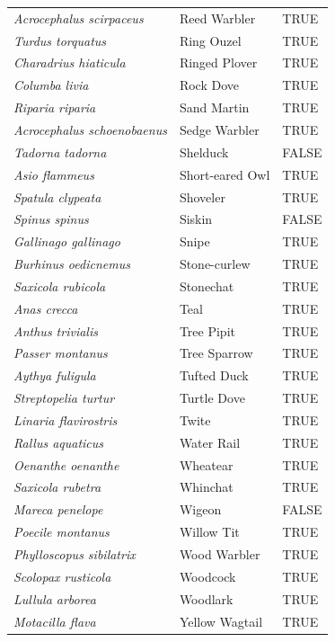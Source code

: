 \documentclass[
]{article}
\begin{document}
\begin{longtable}[]{@{}lll@{}}
\textit{Acrocephalus scirpaceus} & Reed Warbler & TRUE \\
\textit{Turdus torquatus} & Ring Ouzel & TRUE \\
\textit{Charadrius hiaticula} & Ringed Plover & TRUE \\
\textit{Columba livia} & Rock Dove & TRUE \\
\textit{Riparia riparia} & Sand Martin & TRUE \\
\textit{Acrocephalus schoenobaenus} & Sedge Warbler & TRUE \\
\textit{Tadorna tadorna} & Shelduck & FALSE \\
\textit{Asio flammeus} & Short-eared Owl & TRUE \\
\textit{Spatula clypeata} & Shoveler & TRUE \\
\textit{Spinus spinus} & Siskin & FALSE \\
\textit{Gallinago gallinago} & Snipe & TRUE \\
\textit{Burhinus oedicnemus} & Stone-curlew & TRUE \\
\textit{Saxicola rubicola} & Stonechat & TRUE \\
\textit{Anas crecca} & Teal & TRUE \\
\textit{Anthus trivialis} & Tree Pipit & TRUE \\
\textit{Passer montanus} & Tree Sparrow & TRUE \\
\textit{Aythya fuligula} & Tufted Duck & TRUE \\
\textit{Streptopelia turtur} & Turtle Dove & TRUE \\
\textit{Linaria flavirostris} & Twite & TRUE \\
\textit{Rallus aquaticus} & Water Rail & TRUE \\
\textit{Oenanthe oenanthe} & Wheatear & TRUE \\
\textit{Saxicola rubetra} & Whinchat & TRUE \\
\textit{Mareca penelope} & Wigeon & FALSE \\
\textit{Poecile montanus} & Willow Tit & TRUE \\
\textit{Phylloscopus sibilatrix} & Wood Warbler & TRUE \\
\textit{Scolopax rusticola} & Woodcock & TRUE \\
\textit{Lullula arborea} & Woodlark & TRUE \\
\textit{Motacilla flava} & Yellow Wagtail & TRUE \\
\bottomrule
\end{longtable}
\end{document}

